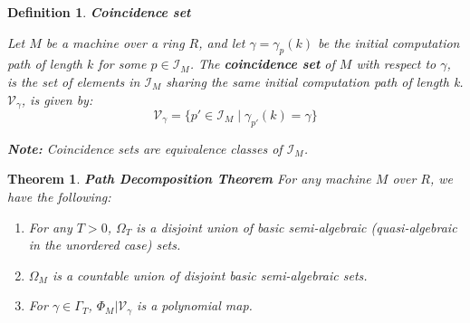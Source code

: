\documentclass[twoside]{article}
\newcommand{\set}[1]{\{#1\}}
\newcommand{\inspace}[0]{\mathcal{I}}
\newcommand{\computefn}[0]{\Phi}
\newcommand{\note}[1]{{\textbf{Note:} #1}}
\newcommand{\halting}[0]{\Omega}
\newcommand{\haltpaths}[1]{\Gamma_{#1}}
\newcommand{\computepath}[0]{\gamma}
\newcommand{\coincidence}[1]{\mathcal{V}_{#1}}
\newtheorem{theorem}{Theorem}[section]
\newtheorem{definition}{Definition}[section]
\begin{document}
  \begin{definition}{\textbf{Coincidence set}}

    Let $M$ be a machine over a ring $R$, and let $\computepath = \computepath_{p}(k)$ be
    the initial computation path of length $k$ for some $p \in
    \inspace_M$. The \textbf{coincidence set} of $M$ with respect to $\computepath$, is the
    set of elements in $\inspace_M$ sharing the same initial computation path of length k.
    $\coincidence{\computepath}$, is given by:
    $$\coincidence{\computepath} = 
    \set{p' \in \inspace_M \mid \computepath_{p'}(k) = \computepath}$$
    
    \emph{\note{Coincidence sets are equivalence classes of $\inspace_M$.}}

  \end{definition}

  \begin{theorem}{\textbf{Path Decomposition Theorem}}
    For any machine $M$ over $R$, we have the following:

    \begin{enumerate}
    \item For any $T > 0$, $\halting_T$ is a disjoint union of basic
      semi-algebraic (quasi-algebraic in the unordered case) sets.

    \item $\halting_M$ is a countable union of disjoint basic
      semi-algebraic sets.

    \item For $\computepath \in \haltpaths{T}$,
      $\computefn_M|\coincidence{\computepath}$ is a polynomial map.
    \end{enumerate}
  \end{theorem}
\end{document}

